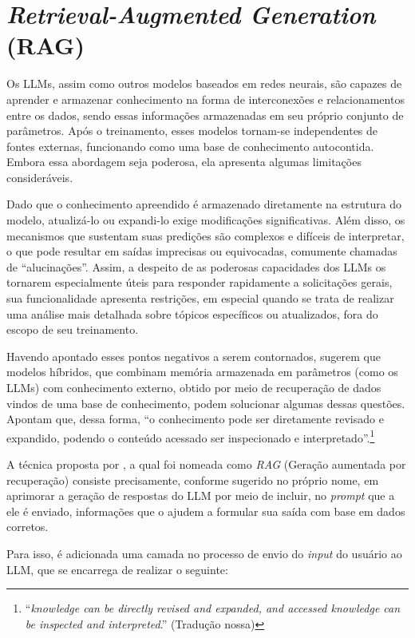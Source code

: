 \section{\textit{Retrieval-Augmented Generation} (RAG)}
\label{sec:Teorico.6}

Os \ac{LLM}s, assim como outros modelos baseados em redes neurais, são capazes de aprender e armazenar conhecimento na forma de interconexões e relacionamentos entre os dados, sendo essas informações armazenadas em seu próprio conjunto de parâmetros. Após o treinamento, esses modelos tornam-se independentes de fontes externas, funcionando como uma base de conhecimento autocontida. Embora essa abordagem seja poderosa, ela apresenta algumas limitações consideráveis.

Dado que o conhecimento apreendido é armazenado diretamente na estrutura do modelo, atualizá-lo ou expandi-lo exige modificações significativas. Além disso, os mecanismos que sustentam suas predições são complexos e difíceis de interpretar, o que pode resultar em saídas imprecisas ou equivocadas, comumente chamadas de ``alucinações''. Assim, a despeito de as poderosas capacidades dos \ac{LLM}s os tornarem especialmente úteis para responder rapidamente a solicitações gerais, sua funcionalidade apresenta restrições, em especial quando se trata de realizar uma análise mais detalhada sobre tópicos específicos ou atualizados, fora do escopo de seu treinamento.

Havendo apontado esses pontos negativos a serem contornados,  sugerem que modelos híbridos, que combinam memória armazenada em parâmetros (como os \ac{LLM}s) com conhecimento externo, obtido por meio de recuperação de dados vindos de uma base de conhecimento, podem solucionar algumas dessas questões. Apontam que, dessa forma, ``o conhecimento pode ser diretamente revisado e expandido, podendo o conteúdo acessado ser inspecionado e interpretado''.\footnote{``\textit{knowledge can be directly revised and expanded, and accessed knowledge can be inspected and interpreted}.'' (Tradução nossa)}

A técnica proposta por , a qual foi nomeada como \textit{\ac{RAG}} (Geração aumentada por recuperação) consiste precisamente, conforme sugerido no próprio nome, em aprimorar a geração de respostas do \ac{LLM} por meio de incluir, no \textit{prompt} que a ele é enviado, informações que o ajudem a formular sua saída com base em dados corretos.

Para isso, é adicionada uma camada no processo de envio do \textit{input} do usuário ao \ac{LLM}, que se encarrega de realizar o seguinte:

